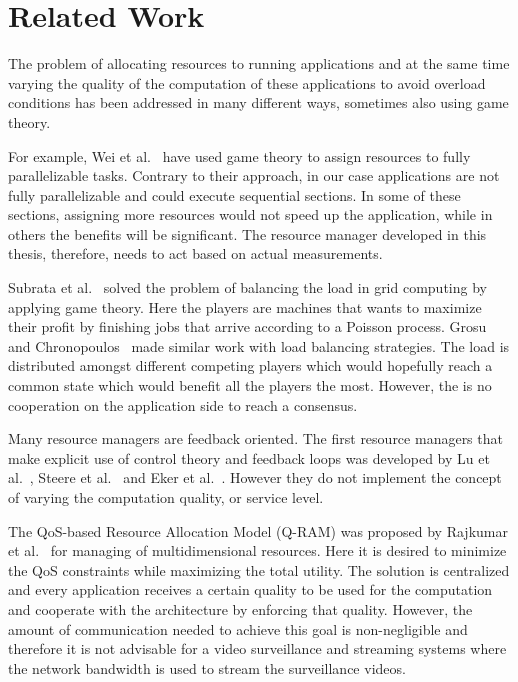 \documentclass[nobiblatex]{LTHthesis}
\begin{document}
\section{Related Work}

The problem of allocating resources to running applications and at the same
time varying the quality of the computation of these applications to avoid
overload conditions has been addressed in many different ways, sometimes
also using game theory.  

For example, Wei et al.~\cite{Wei10} have used game theory to assign
resources to fully parallelizable tasks. Contrary to their approach, in our
case applications are not fully parallelizable and could execute sequential
sections. In some of these sections, assigning more resources would not
speed up the application, while in others the benefits will be significant.
The resource manager developed in this thesis, therefore, needs to act based
on actual measurements.

Subrata et al.~\cite{Sub08} solved the problem of balancing the load in grid 
computing by applying game theory. Here the players are machines that wants 
to maximize their profit by finishing jobs that arrive according to a 
Poisson process. Grosu and Chronopoulos~\cite{Gro05} made similar work with 
load balancing strategies. The load is distributed amongst different 
competing players which would hopefully reach a common state which would 
benefit all the players the most. However, the is no cooperation on the
application side to reach a consensus.

Many resource managers are feedback oriented. The first resource managers
that make explicit use of control theory and feedback loops was developed 
by Lu et al.~\cite{LuS99a}, Steere et al.~\cite{Ste99} and Eker et 
al.~\cite{Eke00}. However they do not implement the concept of varying the
computation quality, or service level.

The QoS-based Resource Allocation Model (Q-RAM) was proposed by Rajkumar et 
al.~\cite{Raj97a} for managing of multidimensional resources. Here it is 
desired to minimize the QoS constraints while maximizing the total 
utility. The solution is centralized and every application receives a
certain quality to be used for the computation and cooperate with the
architecture by enforcing that quality. However, the amount of communication
needed to achieve this goal is non-negligible and therefore it is not
advisable for a video surveillance and streaming systems where the network
bandwidth is used to stream the surveillance videos.
 
\end{document}
